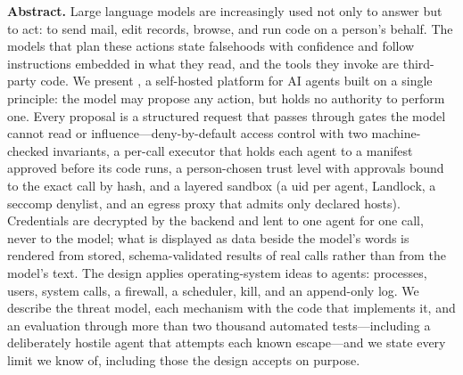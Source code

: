 \begin{center}
\begin{minipage}{0.86\textwidth}
\small
\noindent\textbf{\color{accent}Abstract.}
Large language models are increasingly used not only to answer but to
act: to send mail, edit records, browse, and run code on a person's
behalf. The models that plan these actions state falsehoods with
confidence and follow instructions embedded in what they read, and the
tools they invoke are third-party code. We present \sys{}, a
self-hosted platform for AI agents built on a single principle: the
model may propose any action, but holds no authority to perform one.
Every proposal is a structured request that passes through gates the
model cannot read or influence---deny-by-default access control with
two machine-checked invariants, a per-call executor that holds each
agent to a manifest approved before its code runs, a person-chosen
trust level with approvals bound to the exact call by hash, and a
layered sandbox (a uid per agent, Landlock, a seccomp denylist, and an
egress proxy that admits only declared hosts). Credentials are
decrypted by the backend and lent to one agent for one call, never to
the model; what is displayed as data beside the model's words is
rendered from stored, schema-validated results of real calls rather
than from the model's text. The design applies operating-system ideas
to agents: processes, users, system calls, a firewall, a scheduler,
kill, and an append-only log. We describe the threat model, each
mechanism with the code that implements it, and an evaluation through
more than two thousand automated tests---including a deliberately
hostile agent that attempts each known escape---and we state every
limit we know of, including those the design accepts on purpose.
\end{minipage}
\end{center}
